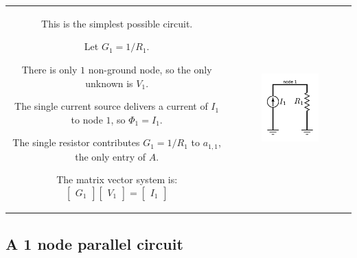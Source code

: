 \documentclass{article}
\begin{document}
\begin{tabular}{cc}
\parbox{0.5\textwidth}{
This is the simplest possible circuit.

Let \(G_1 = 1/R_1\). 

There is only \(1\) non-ground node, so the only unknown is \(V_1\). 

The single current source delivers a current of \(I_1\) to node \(1\), so \(\Phi_1 = I_1\). 

The single resistor contributes \(G_1 = 1/R_1\) to \(a_{1,1}\), the only entry of \(A\). 

The matrix vector system is:
\[\begin{bmatrix} G_1 \end{bmatrix}\begin{bmatrix} V_1 \end{bmatrix} = \begin{bmatrix} I_1 \end{bmatrix}\]
} & \parbox{0.5\textwidth}{
\includegraphics[width = 0.5\textwidth]{simplest_circuit}
}
\end{tabular}



\subsection{A 1 node parallel circuit}
\end{document}
